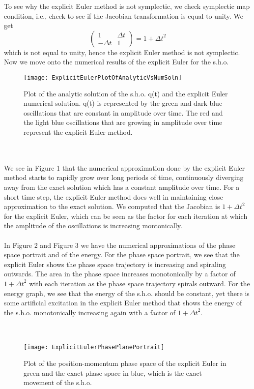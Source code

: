 \documentclass[12pt]{article}
\begin{document}
To see why the explicit Euler method is not symplectic, we check symplectic map condition, i.e., check to see if the Jacobian transformation is equal to unity. We get
\[\left(\begin{matrix}
  1 & \Delta t \\
  -\Delta t & 1 
 \end{matrix}\right)=1+{\Delta t}^{2}\]
which is not equal to unity, hence the explicit Euler method is not symplectic. Now we move onto the numerical results of the explicit Euler for the s.h.o.
\begin{figure}[h!]
\centering
\texttt{[image: ExplicitEulerPlotOfAnalyticVsNumSoln]}
\caption{Plot of the analytic solution of the s.h.o. q(t) and the explicit Euler numerical solution. q(t) is represented by the green and dark blue oscillations that are constant in amplitude over time. The red and the light blue oscillations that are growing in amplitude over time represent the explicit Euler method.}
\end{figure}
\\\\
\indent We see in Figure 1 that the numerical approximation done by the explicit Euler method starts to rapidly grow over long periods of time, continuously diverging away from the exact solution which has a constant amplitude over time. For a short time step, the explicit Euler method does well in maintaining close approximation to the exact solution. We computed that the Jacobian is $1+{\Delta t}^{2}$ for the explicit Euler, which can be seen as the factor for each iteration at which the amplitude of the oscillations is increasing montonically. 
\\\\
\indent In Figure 2 and Figure 3 we have the numerical approximations of the phase space portrait and of the energy. For the phase space portrait, we see that the explicit Euler shows the phase space trajectory is increasing and spiraling outwards. The area in the phase space increases monotonically by a factor of $1+{\Delta t}^{2}$ with each iteration as the phase space trajectory spirals outward. For the energy graph, we see that the energy of the s.h.o. should be constant, yet there is some artificial excitation in the explicit Euler method that shows the energy of the s.h.o. monotonically increasing again with a factor of $1+{\Delta t}^{2}$. \\\\\\
\begin{figure}[h!]
\centering
\texttt{[image: ExplicitEulerPhasePlanePortrait]}
\caption{Plot of the position-momentum phase space of the explicit Euler in green and the exact phase space in blue, which is the exact movement of the s.h.o.}
\end{figure}
\end{document}
